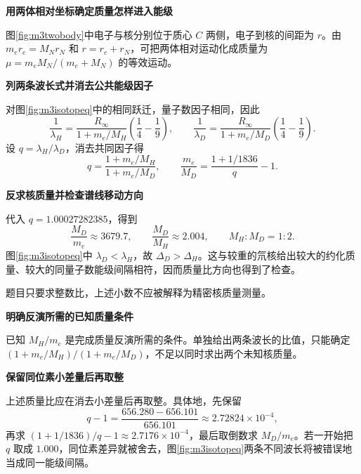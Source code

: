 \begin{solution}\textbf{用两体相对坐标确定质量怎样进入能级}\par\nobreak
图\ref{fig:m3twobody}中电子与核分别位于质心 \(C\) 两侧，电子到核的间距为 \(r\)。由 \(m_er_e=M_Nr_N\) 和 \(r=r_e+r_N\)，可把两体相对运动化成质量为 \(\mu=m_eM_N/(m_e+M_N)\) 的等效运动。



\par\medskip{}\noindent\textbf{列两条波长式并消去公共能级因子}\par\nobreak
对图\ref{fig:m3isotopeq}中的相同跃迁，量子数因子相同，因此
\[
 \frac1{\lambda_H}=\frac{R_\infty}{1+m_e/M_H}\left(\frac14-\frac19\right),\qquad
 \frac1{\lambda_D}=\frac{R_\infty}{1+m_e/M_D}\left(\frac14-\frac19\right).
\]
设 \(q=\lambda_H/\lambda_D\)，消去共同因子得
\[
 q=\frac{1+m_e/M_H}{1+m_e/M_D},\qquad
 \frac{m_e}{M_D}=\frac{1+1/1836}{q}-1.
\]


\par\medskip{}\noindent\textbf{反求核质量并检查谱线移动方向}\par\nobreak
代入 \(q=1.00027282385\)，得到
\[
 \frac{M_D}{m_e}\approx3679.7,\qquad
 \frac{M_D}{M_H}\approx2.004,
 \qquad\boxed{M_H:M_D=1:2}.
\]
图\ref{fig:m3isotopeq}中 \(\lambda_D<\lambda_H\)，故 \(\Delta_D>\Delta_H\)。这与较重的氘核给出较大的约化质量、较大的同量子数能级间隔相符，因而质量比方向也得到了检查。

题目只要求整数比，上述小数不应被解释为精密核质量测量。



\par\medskip{}\noindent\textbf{明确反演所需的已知质量条件}\par\nobreak
已知 \(M_H/m_e\) 是完成质量反演所需的条件。单独给出两条波长的比值，只能确定 \((1+m_e/M_H)/(1+m_e/M_D)\)，不足以同时求出两个未知核质量。



\par\medskip{}\noindent\textbf{保留同位素小差量后再取整}\par\nobreak
上述质量比应在消去小差量后再取整。具体地，先保留
\[
 q-1=\frac{656.280-656.101}{656.101}
 \approx2.72824\times10^{-4},
\]
再求 \((1+1/1836)/q-1\approx2.7176\times10^{-4}\)，最后取倒数求 \(M_D/m_e\)。若一开始把 \(q\) 取成 \(1.000\)，同位素差异就被舍去，图\ref{fig:m3isotopeq}两条不同波长将被错误地当成同一能级间隔。
\end{solution}


